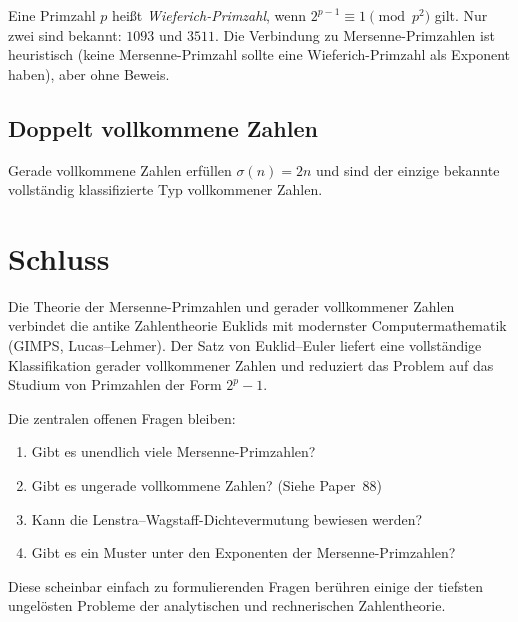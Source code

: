 \documentclass[12pt,a4paper]{amsart}
\theoremstyle{definition}
\theoremstyle{remark}
\begin{document}
Eine Primzahl $p$ heißt \emph{Wieferich-Primzahl}, wenn
$2^{p-1} \equiv 1 \pmod{p^2}$ gilt.
Nur zwei sind bekannt: $1093$ und $3511$.
Die Verbindung zu Mersenne-Primzahlen ist heuristisch (keine Mersenne-Primzahl
sollte eine Wieferich-Primzahl als Exponent haben), aber ohne Beweis.

\subsection{Doppelt vollkommene Zahlen}

Gerade vollkommene Zahlen erfüllen $\sigma(n) = 2n$ und sind der einzige
bekannte vollständig klassifizierte Typ vollkommener Zahlen.

\section{Schluss}

Die Theorie der Mersenne-Primzahlen und gerader vollkommener Zahlen verbindet
die antike Zahlentheorie Euklids mit modernster Computermathematik (GIMPS,
Lucas--Lehmer).
Der Satz von Euklid--Euler liefert eine vollständige Klassifikation gerader
vollkommener Zahlen und reduziert das Problem auf das Studium von Primzahlen
der Form $2^p - 1$.

Die zentralen offenen Fragen bleiben:
\begin{enumerate}[label=(\arabic*)]
  \item Gibt es unendlich viele Mersenne-Primzahlen?
  \item Gibt es ungerade vollkommene Zahlen? (Siehe Paper~88)
  \item Kann die Lenstra--Wagstaff-Dichtevermutung bewiesen werden?
  \item Gibt es ein Muster unter den Exponenten der Mersenne-Primzahlen?
\end{enumerate}

Diese scheinbar einfach zu formulierenden Fragen berühren einige der tiefsten
ungelösten Probleme der analytischen und rechnerischen Zahlentheorie.
\end{document}
